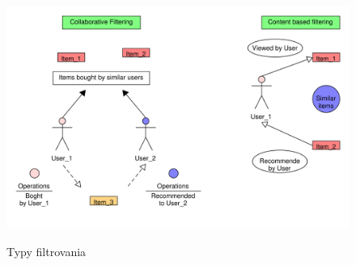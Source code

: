 \documentclass[10pt,slovak,a4paper]{article}
\begin{document}
\begin{figure}[h!]
  \centering
  \includegraphics[width=1\textwidth]{Images_tables/Filtering_pdf.pdf}
  \label{Types:of:filtering}
  \caption{Typy filtrovania}

\end{figure}
\end{document}
